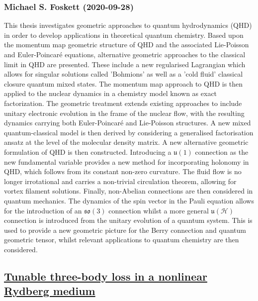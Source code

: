 \subsubsection*{Michael S. Foskett (2020-09-28)}
This thesis investigates geometric approaches to quantum hydrodynamics (QHD)
in order to develop applications in theoretical quantum chemistry.
  Based upon the momentum map geometric structure of QHD and the associated
Lie-Poisson and Euler-Poincar\'e equations, alternative geometric approaches to
the classical limit in QHD are presented. These include a new regularised
Lagrangian which allows for singular solutions called 'Bohmions' as well as a
'cold fluid' classical closure quantum mixed states.
  The momentum map approach to QHD is then applied to the nuclear dynamics in a
chemistry model known as exact factorization. The geometric treatment extends
existing approaches to include unitary electronic evolution in the frame of the
nuclear flow, with the resulting dynamics carrying both Euler-Poincar\'e and
Lie-Poisson structures. A new mixed quantum-classical model is then derived by
considering a generalised factorisation ansatz at the level of the molecular
density matrix.
  A new alternative geometric formulation of QHD is then constructed.
Introducing a $\mathfrak{u}(1)$ connection as the new fundamental variable
provides a new method for incorporating holonomy in QHD, which follows from its
constant non-zero curvature. The fluid flow is no longer irrotational and
carries a non-trivial circulation theorem, allowing for vortex filament
solutions.
  Finally, non-Abelian connections are then considered in quantum mechanics.
The dynamics of the spin vector in the Pauli equation allows for the
introduction of an $\mathfrak{so}(3)$ connection whilst a more general
$\mathfrak{u}(\mathscr{H})$ connection is introduced from the unitary evolution
of a quantum system. This is used to provide a new geometric picture for the
Berry connection and quantum geometric tensor, whilst relevant applications to
quantum chemistry are then considered.

\subsection*{\href{http://arxiv.org/abs/2009.13599v1}{Tunable three-body loss in a nonlinear Rydberg medium}}
